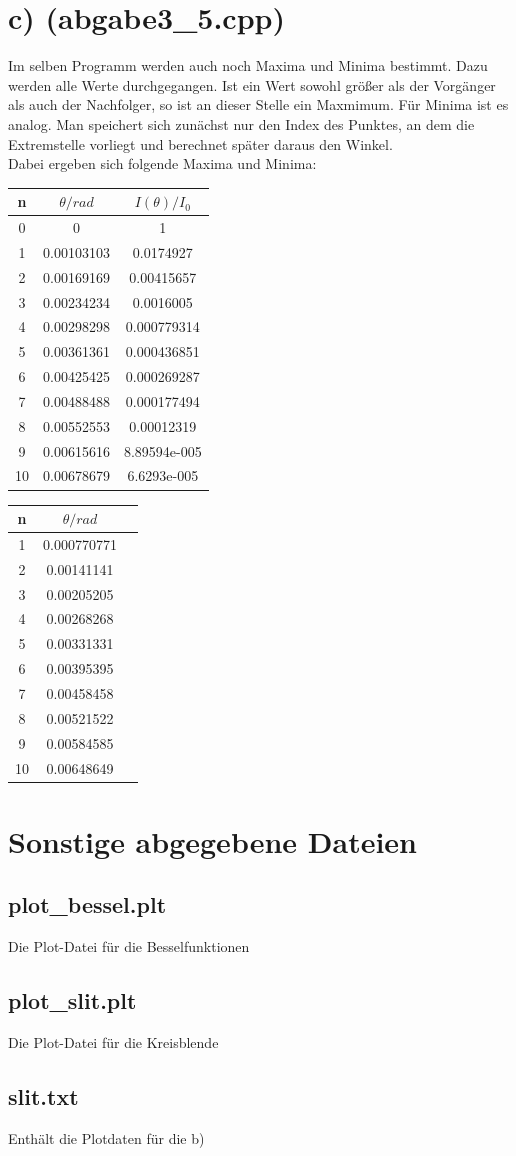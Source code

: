 \documentclass{scrreprt}
\begin{document}
\section*{c) (abgabe3\_5.cpp)}
Im selben Programm werden auch noch Maxima und Minima bestimmt. Dazu werden alle Werte durchgegangen. Ist ein Wert sowohl größer als der Vorgänger als auch der Nachfolger, so ist an dieser Stelle ein Maxmimum. Für Minima ist es analog. Man speichert sich zunächst nur den Index des Punktes, an dem die Extremstelle vorliegt und berechnet später daraus den Winkel.\\
Dabei ergeben sich folgende Maxima und Minima:\\
\begin{center}
\begin{tabular}{ccc}
\toprule
n & $\theta/rad$ & $I(\theta)/I_0$\\
\midrule
0 & 0 & 1\\
1 & 0.00103103 & 0.0174927\\
2 & 0.00169169 & 0.00415657\\
3 & 0.00234234 & 0.0016005\\
4 & 0.00298298 & 0.000779314\\
5 & 0.00361361 & 0.000436851\\
6 & 0.00425425 & 0.000269287\\
7 & 0.00488488 & 0.000177494\\
8 & 0.00552553 & 0.00012319\\
9 & 0.00615616 & 8.89594e-005\\
10 & 0.00678679 & 6.6293e-005\\
\bottomrule
\end{tabular}
\end{center}

\begin{center}
\begin{tabular}{ccc}
\toprule
n & $\theta/rad$\\
\midrule
1 & 0.000770771\\
2 & 0.00141141\\
3 & 0.00205205\\
4 & 0.00268268\\
5 & 0.00331331\\
6 & 0.00395395\\
7 & 0.00458458\\
8 & 0.00521522\\
9 & 0.00584585\\
10 & 0.00648649\\
\bottomrule
\end{tabular}
\end{center}

\section*{Sonstige abgegebene Dateien}
\subsection*{plot\_bessel.plt}
Die Plot-Datei für die Besselfunktionen
\subsection*{plot\_slit.plt}
Die Plot-Datei für die Kreisblende
\subsection*{slit.txt}
Enthält die Plotdaten für die b)
\end{document}
